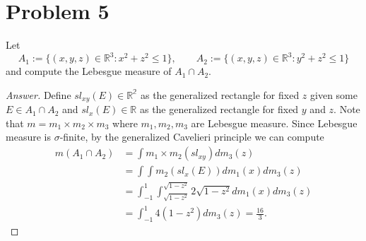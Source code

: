 \documentclass[12pt]{article}
\newcommand{\R}{\mathbb{R}}
\newenvironment{answer}{\begin{proof}[Answer]}{\end{proof}}
\begin{document}
\section*{Problem 5}
Let
\[
	A_1 := \{(x,y,z) \in \R^3 : x^2 + z^2 \leq 1\}, \qquad A_2 := \{(x,y,z) \in \R^3 : y^2 + z^2 \leq 1\}
\]
and compute the Lebesgue measure of $A_1 \cap A_2$.

\begin{answer}
	Define $sl_{xy}(E) \in \mathbb{R^2}$ as the generalized rectangle for fixed $z$ given some $E \in A_1 \cap A_2$ and $sl_x(E) \in \mathbb{R}$ as the generalized rectangle for fixed $y$ and $z$. Note that $m = m_1 \times m_2 \times m_3$ where $m_1, m_2, m_3$ are Lebesgue measure. Since Lebesgue measure is $\sigma$-finite, by the generalized Cavelieri principle we can compute
	\begin{align}
		m(A_1 \cap A_2) & = \int m_1\times m_2(sl_{xy})dm_3(z)                                          \\
		                & = \int \int m_2(sl_x(E))dm_1(x)dm_3(z)                                        \\
		                & = \int_{-1}^1 \int_{\sqrt{1-z^2}}^{\sqrt{1-z^2}} 2\sqrt{1-z^2} dm_1(x)dm_3(z) \\
		                & = \int_{-1}^1 4(1-z^2)dm_3(z) = \frac{16}{3}.
	\end{align}
\end{answer}
\end{document}
